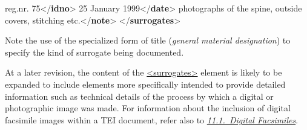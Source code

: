 \begin{shaded}
\hspace*{1em}reg.nr. 75{</\textbf{idno}>}\mbox{}\newline 
\hspace*{1em}25 January 1999{</\textbf{date}>}\mbox{}\newline 
\hspace*{1em}photographs of the spine, outside covers, stitching etc.{</\textbf{note}>}\mbox{}\newline 
{}\mbox{}\newline 
{</\textbf{surrogates}>}\end{shaded}\egroup\par \noindent  Note the use of the specialized form of title (\textit{general material designation}) to specify the kind of surrogate being documented.\par
At a later revision, the content of the \hyperref[TEI.surrogates]{<surrogates>} element is likely to be expanded to include elements more specifically intended to provide detailed information such as technical details of the process by which a digital or photographic image was made. For information about the inclusion of digital facsimile images within a TEI document, refer also to \textit{\hyperref[PHFAX]{11.1.\ Digital Facsimiles}}.

